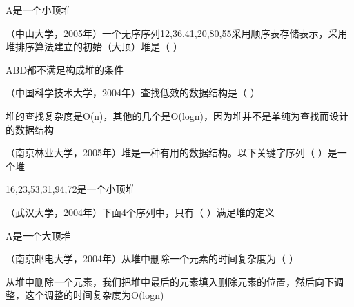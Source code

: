 \par{}
\begin{solution}A是一个小顶堆
\end{solution}
\question （中山大学，2005年）一个无序序列12,36,41,20,80,55采用顺序表存储表示，采用堆排序算法建立的初始（大顶）堆是（
）
\par{}
\begin{solution}ABD都不满足构成堆的条件
\end{solution}
\question （中国科学技术大学，2004年）查找低效的数据结构是（ ）
\par{}
\begin{solution}堆的查找复杂度是O(n)，其他的几个是O(logn)，因为堆并不是单纯为查找而设计的数据结构
\end{solution}
\question （南京林业大学，2005年）堆是一种有用的数据结构。以下关键字序列（
）是一个堆
\par{}
\begin{solution}16,23,53,31,94,72是一个小顶堆
\end{solution}
\question （武汉大学，2004年）下面4个序列中，只有（ ）满足堆的定义
\par{}
\begin{solution}A是一个大顶堆
\end{solution}
\question （南京邮电大学，2004年）从堆中删除一个元素的时间复杂度为（ ）
\par{}
\begin{solution}从堆中删除一个元素，我们把堆中最后的元素填入删除元素的位置，然后向下调整，这个调整的时间复杂度为O(logn)
\end{solution}

